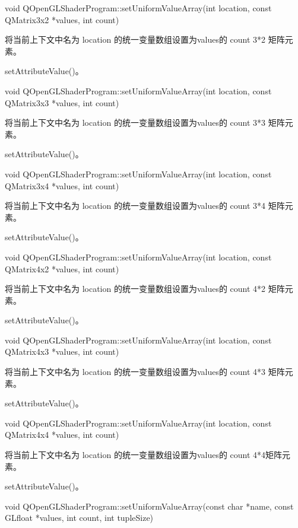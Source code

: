 void QOpenGLShaderProgram::setUniformValueArray(int location, const QMatrix3x2 *values, int count)

将当前上下文中名为 location 的统一变量数组设置为values的 count 3*2 矩阵元素。

\begin{seeAlso}
setAttributeValue()。
\end{seeAlso}

void QOpenGLShaderProgram::setUniformValueArray(int location, const QMatrix3x3 *values, int count)

将当前上下文中名为 location 的统一变量数组设置为values的 count 3*3 矩阵元素。

\begin{seeAlso}
setAttributeValue()。
\end{seeAlso}

void QOpenGLShaderProgram::setUniformValueArray(int location, const QMatrix3x4 *values, int count)

将当前上下文中名为 location 的统一变量数组设置为values的 count 3*4 矩阵元素。

\begin{seeAlso}
setAttributeValue()。
\end{seeAlso}

void QOpenGLShaderProgram::setUniformValueArray(int location, const QMatrix4x2 *values, int count)

将当前上下文中名为 location 的统一变量数组设置为values的 count 4*2 矩阵元素。


\begin{seeAlso}
setAttributeValue()。
\end{seeAlso}

void QOpenGLShaderProgram::setUniformValueArray(int location, const QMatrix4x3 *values, int count)

将当前上下文中名为 location 的统一变量数组设置为values的 count 4*3 矩阵元素。

\begin{seeAlso}
setAttributeValue()。
\end{seeAlso}

void QOpenGLShaderProgram::setUniformValueArray(int location, const QMatrix4x4 *values, int count)

将当前上下文中名为 location 的统一变量数组设置为values的 count 4*4矩阵元素。


\begin{seeAlso}
setAttributeValue()。
\end{seeAlso}

void QOpenGLShaderProgram::setUniformValueArray(const char *name, const GLfloat *values, int count, int tupleSize)

